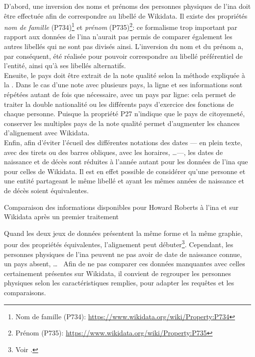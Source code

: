 D'abord, une inversion des noms et prénoms des personnes physiques de l'\ac{ina} doit être effectuée afin de correspondre au libellé de Wikidata. Il existe des propriétés \textit{nom de famille} (P734)\footnote{Nom de famille (P734): \url{https://www.wikidata.org/wiki/Property:P734}} et \textit{prénom} (P735)\footnote{Prénom (P735): \url{https://www.wikidata.org/wiki/Property:P735}}: ce formalisme trop important par rapport aux données de l'\ac{ina} n'aurait pas permis de comparer également les autres libellés qui ne sont pas divisés ainsi. L'inversion du nom et du prénom a, par conséquent, été réalisée pour pouvoir correspondre au libellé préférentiel de l'entité, ainsi qu'à ses libellés alternatifs.\\

Ensuite, le pays doit être extrait de la note qualité selon la méthode expliquée à la . Dans le cas d'une note avec plusieurs pays, la ligne et ses informations sont répétées autant de fois que nécessaire, avec un pays par ligne: cela permet de traiter la double nationalité ou les différents pays d'exercice des fonctions de chaque personne. Puisque la propriété P27 n'indique que le pays de citoyenneté, conserver les multiples pays de la note qualité permet d'augmenter les chances d'alignement avec Wikidata.\\

Enfin, afin d'éviter l'écueil des différentes notations des dates --- en plein texte, avec des tirets ou des barres obliques, avec les horaires, \dots ---, les dates de naissance et de décès sont réduites à l'année autant pour les données de l'\ac{ina} que pour celles de Wikidata. Il est en effet possible de considérer qu'une personne et une entité partageant le même libellé et ayant les mêmes années de naissance et de décès soient équivalentes.
\begin{table}[h!]
	\centering
	\caption{Comparaison des informations disponibles pour Howard Roberts à l'\ac{ina} et sur Wikidata après un premier traitement}
	\label{table_roberts_3}
\end{table}
\medskip

Quand les deux jeux de données présentent la même forme et la même graphie, pour des propriétés équivalentes, l'alignement peut débuter\footnote{Voir .}. Cependant, les personnes physiques de l'\ac{ina} peuvent ne pas avoir de date de naissance connue, un pays absent, \dots~ Afin de ne pas comparer ces données manquantes avec celles certainement présentes sur Wikidata, il convient de regrouper les personnes physiques selon les caractéristiques remplies, pour adapter les requêtes et les comparaisons.

